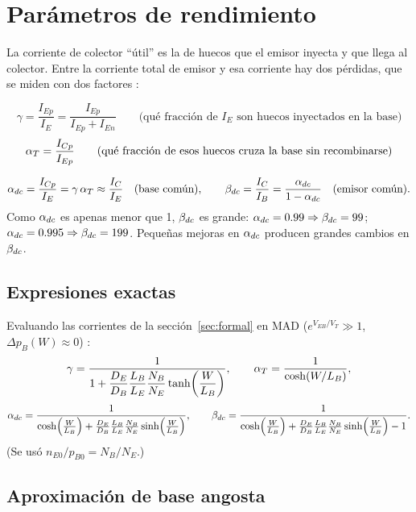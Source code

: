 \section{Parámetros de rendimiento}
\label{sec:parametros}

La corriente de colector ``útil'' es la de huecos que el emisor inyecta y que llega al
colector. Entre la corriente total de emisor y esa corriente hay dos pérdidas, que se miden
con dos factores :

\begin{definicion}
\[
  \gamma = \frac{I_{Ep}}{I_E} = \frac{I_{Ep}}{I_{Ep}+I_{En}}
  \qquad\text{(qué fracción de $I_E$ son huecos inyectados en la base)}
\]
\[
  \alpha_T = \frac{I_{Cp}}{I_{Ep}}
  \qquad\text{(qué fracción de esos huecos cruza la base sin recombinarse)}
\]
\end{definicion}

\begin{definicion}
\[
  \alpha_{dc} = \frac{I_{Cp}}{I_E} = \gamma\,\alpha_T \approx \frac{I_C}{I_E}
  \quad\text{(base común)},
  \qquad
  \beta_{dc} = \frac{I_C}{I_B} = \frac{\alpha_{dc}}{1-\alpha_{dc}}
  \quad\text{(emisor común)}.
\]
Como $\alpha_{dc}$ es apenas menor que 1, $\beta_{dc}$ es grande: $\alpha_{dc}=0.99\Rightarrow\beta_{dc}=99$;
$\alpha_{dc}=0.995\Rightarrow\beta_{dc}=199$. Pequeñas mejoras en $\alpha_{dc}$ producen grandes cambios en $\beta_{dc}$.
\end{definicion}

\subsection{Expresiones exactas}

Evaluando las corrientes de la sección~\ref{sec:formal} en MAD
($e^{V_{EB}/V_T}\gg1$, $\Delta p_B(W)\approx0$) :
\[
  \gamma = \frac{1}{1+\dfrac{D_E}{D_B}\dfrac{L_B}{L_E}\dfrac{N_B}{N_E}\tanh\!\left(\dfrac{W}{L_B}\right)},
  \qquad
  \alpha_T = \frac{1}{\cosh(W/L_B)},
\]
\[
  \alpha_{dc} = \frac{1}{\cosh\!\left(\frac{W}{L_B}\right)
         + \frac{D_E}{D_B}\frac{L_B}{L_E}\frac{N_B}{N_E}\sinh\!\left(\frac{W}{L_B}\right)},
  \qquad
  \beta_{dc} = \frac{1}{\cosh\!\left(\frac{W}{L_B}\right)
         + \frac{D_E}{D_B}\frac{L_B}{L_E}\frac{N_B}{N_E}\sinh\!\left(\frac{W}{L_B}\right)-1}.
\]
(Se usó $n_{E0}/p_{B0}=N_B/N_E$.)

\subsection{Aproximación de base angosta}

